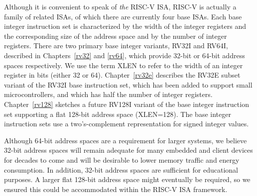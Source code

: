 Although it is convenient to speak of {\em the} RISC-V ISA, RISC-V is
actually a family of related ISAs, of which there are currently four
base ISAs.  Each base integer instruction set is characterized by the
width of the integer registers and the corresponding size of the
address space and by the number of integer registers.  There are two
primary base integer variants, RV32I and RV64I, described in
Chapters~\ref{rv32} and \ref{rv64}, which provide 32-bit or 64-bit
address spaces respectively.  We use the term XLEN to refer to the
width of an integer register in bits (either 32 or 64).
Chapter~\ref{rv32e} describes the RV32E subset variant of the RV32I
base instruction set, which has been added to support small
microcontrollers, and which has half the number of integer registers.
Chapter~\ref{rv128} sketches a future RV128I variant of the base
integer instruction set supporting a flat 128-bit address space
(XLEN=128).  The base integer instruction sets use a two's-complement
representation for signed integer values.

\begin{commentary}
Although 64-bit address spaces are a requirement for larger systems,
we believe 32-bit address spaces will remain adequate for many
embedded and client devices for decades to come and will be desirable
to lower memory traffic and energy consumption.  In addition, 32-bit
address spaces are sufficient for educational purposes.  A larger flat
128-bit address space might eventually be required, so we ensured this
could be accommodated within the RISC-V ISA framework.
\end{commentary}

